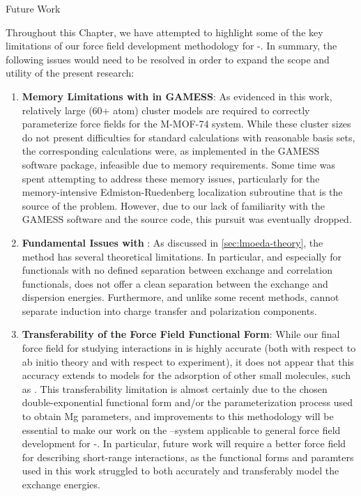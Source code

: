 \begin{section}{Future Work}
\label{sec:lmoeda-future_work}

Throughout this Chapter, we have attempted to highlight some of the key
limitations of our force field development methodology for \cus-\mofs. 
In summary, the following issues would need to be resolved in order to expand the
scope and utility of the present research:
\begin{enumerate}
%
\item \textbf{Memory Limitations with \lmoeda in GAMESS}: 
%
As evidenced in this work,
relatively large (60+ atom) cluster models are required to correctly
parameterize force fields for the M-MOF-74 system. While these cluster sizes
do not present difficulties for standard \dft calculations with reasonable
basis sets, the corresponding
\lmoeda calculations were, as implemented in the GAMESS software package,
infeasible due to memory requirements. Some time was spent attempting to
address these memory issues, particularly for the memory-intensive
Edmiston-Ruedenberg localization subroutine that is the source of the problem.
However, due to our lack of familiarity with the GAMESS software and the
\lmoeda source code, this pursuit was eventually dropped. 
%
\item \textbf{Fundamental Issues with \lmoeda}: 
%
As discussed in \cref{sec:lmoeda-theory}, the \lmoeda method has several
theoretical limitations. In particular, and especially for functionals with no
defined separation between exchange and correlation functionals, \lmoeda does
not offer a clean separation between the exchange and dispersion energies.
Furthermore, and unlike some recent \eda
methods,\cite{Misquitta2013,Horn2016b} \lmoeda cannot separate induction
into charge transfer and polarization components. 
%
\item \textbf{Transferability of the Force Field Functional Form}: 
%
While our
final force field for 
studying \co interactions in \mgmof is highly accurate (both with respect to
ab initio theory and with respect to experiment), it does not appear that this 
accuracy extends to models for the adsorption of other small molecules, such as
. This transferability limitation is almost certainly due to the chosen
double-exponential functional form and/or the parameterization process used to
obtain Mg parameters, and improvements to this methodology will be essential
to make our work on the \co--\mgmof system applicable to general force field
development for \cus-\mofs. In particular, future work will require a better force field for describing
short-range interactions, as the functional forms and paramters used in this
work struggled to both accurately and transferably model the \mgmof exchange energies.
%
\end{enumerate}


\end{section}
